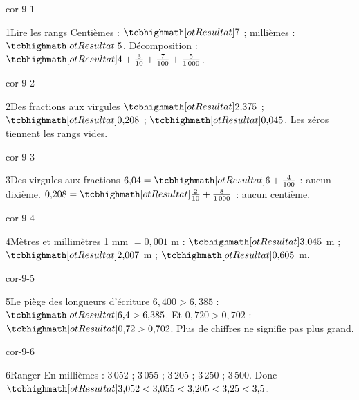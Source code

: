 \clearpage\pagestyle{otMain}\setlength{\otBlocEspacement}{2.5mm}\fontsize{11}{15}\selectfont{}
\begin{blocLivre}{cor-9-1}\begin{corrige}{1}{Lire les rangs}
Centièmes : $\res7$ ; millièmes : $\res5$. Décomposition : $\res{4+\frac3{10}+\frac7{100}+\frac5{1\,000}}$.
\end{corrige}\end{blocLivre}
\begin{blocLivre}{cor-9-2}\begin{corrige}{2}{Des fractions aux virgules}
$\res{2{,}375}$ ; $\res{0{,}208}$ ; $\res{0{,}045}$. Les zéros tiennent les rangs vides.
\end{corrige}\end{blocLivre}
\begin{blocLivre}{cor-9-3}\begin{corrige}{3}{Des virgules aux fractions}
$6{,}04=\res{6+\frac4{100}}$ : aucun dixième. $0{,}208=\res{\frac2{10}+\frac8{1\,000}}$ : aucun centième.
\end{corrige}\end{blocLivre}
\begin{blocLivre}{cor-9-4}\begin{corrige}{4}{Mètres et millimètres}
1 mm $=0{,}001$ m : $\res{3{,}045}$ m ; $\res{2{,}007}$ m ; $\res{0{,}605}$ m.
\end{corrige}\end{blocLivre}
\begin{blocLivre}{cor-9-5}\begin{corrige}{5}{Le piège des longueurs d’écriture}
$6{,}400>6{,}385$ : $\res{6{,}4>6{,}385}$. Et $0{,}720>0{,}702$ : $\res{0{,}72>0{,}702}$. Plus de chiffres ne signifie pas plus grand.
\end{corrige}\end{blocLivre}
\begin{blocLivre}{cor-9-6}\begin{corrige}{6}{Ranger}
En millièmes : $3\,052$ ; $3\,055$ ; $3\,205$ ; $3\,250$ ; $3\,500$. Donc $\res{3{,}052<3{,}055<3{,}205<3{,}25<3{,}5}$.
\end{corrige}\end{blocLivre}
